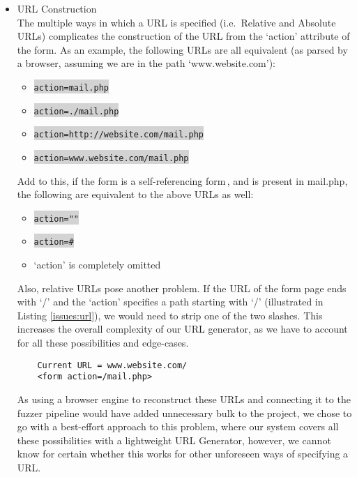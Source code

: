 \begin{itemize}
	\item URL Construction\\
	The multiple ways in which a URL is specified (i.e.\ Relative and Absolute URLs) complicates the construction of the URL from the `action' attribute of the form.  As an example, the following URLs are all equivalent (as parsed by a browser, assuming we are in the path `www.website.com'):
	
	\begin{itemize}
		\item \colorbox{lightgray}{\lstinline{action=mail.php}}
		\item \colorbox{lightgray}{\lstinline{action=./mail.php}}
		\item \colorbox{lightgray}{\lstinline{action=http://website.com/mail.php}}
		\item \colorbox{lightgray}{\lstinline{action=www.website.com/mail.php}}
	\end{itemize}
	Add to this, if the form is a self-referencing form\,\footnotemark, and is present in mail.php, the following are equivalent to the above URLs as well:
	\begin{itemize}
		\item \colorbox{lightgray}{\lstinline{action=""}}
		\item \colorbox{lightgray}{\lstinline{action=#}}
		\item `action' is completely omitted
	\end{itemize}
	Also, relative URLs pose another problem. If the URL of the form page ends with `/' and the `action' specifies a path starting with `/' (illustrated in Listing \ref{issues:url}), we would need to strip one of the two slashes. This increases the overall complexity of our URL generator, as we have to account for all these possibilities and edge-cases.
		
	\begin{lstlisting}
	Current URL = www.website.com/
	<form action=/mail.php>
	\end{lstlisting}
	
	As using a browser engine to reconstruct these URLs  and connecting it to the fuzzer pipeline would have added unnecessary bulk to the project, we chose to go with a best-effort approach to this problem, where our system covers all these possibilities with a lightweight URL Generator, however, we cannot know for certain whether this works for other unforeseen ways of specifying a URL.
	

\end{itemize}
